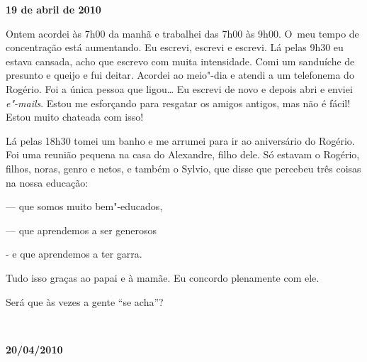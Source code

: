 \begin{flushright}\textbf{19 de abril de 2010}\end{flushright}


Ontem acordei às 7h00 da manhã e trabalhei das 7h00 às 9h00. O~meu tempo
de concentração está aumentando. Eu escrevi, escrevi e escrevi. Lá pelas
9h30 eu estava cansada, acho que escrevo com muita intensidade. Comi um
sanduíche de presunto e queijo e fui deitar. Acordei ao meio"-dia e
atendi a um telefonema do Rogério. Foi a única pessoa que ligou…
Eu escrevi de novo e depois abri e enviei \emph{e"-mails}. Estou me
esforçando para resgatar os amigos antigos, mas não é fácil! Estou muito
chateada com isso!

Lá pelas 18h30 tomei um banho e me arrumei para ir ao aniversário do
Rogério. Foi uma reunião pequena na casa do Alexandre, filho dele. Só
estavam o Rogério, filhos, noras, genro e netos, e também o Sylvio, que
disse que percebeu três coisas na nossa educação:

--- que somos muito bem"-educados,

--- que aprendemos a ser generosos

- e que aprendemos a ter garra.

Tudo isso graças ao papai e à mamãe. Eu concordo plenamente com ele.

Será que às vezes a gente ``se acha''?

\begin{center}\asterisc{}​\end{center}

\begin{flushright}\textbf{}\end{flushright}

\begin{flushright}\textbf{20/04/2010}\end{flushright}


